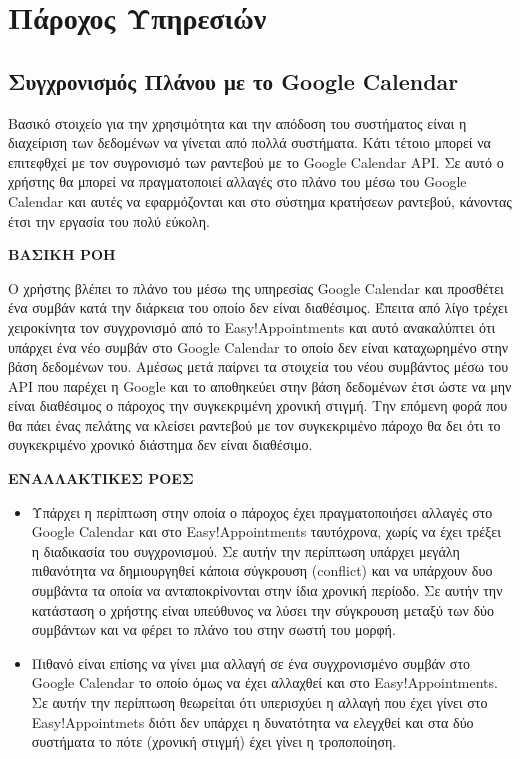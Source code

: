 \section {Πάροχος Υπηρεσιών}
\subsection {Συγχρονισμός Πλάνου με το Google Calendar}
Βασικό στοιχείο για την χρησιμότητα και την απόδοση του συστήματος είναι η διαχείριση των δεδομένων να γίνεται από πολλά συστήματα. Κάτι τέτοιο μπορεί να επιτεφθχεί με τον συγρονισμό των ραντεβού με το Google Calendar API. Σε αυτό ο χρήστης θα μπορεί να πραγματοποιεί αλλαγές στο πλάνο του μέσω του Google Calendar και αυτές να εφαρμόζονται και στο σύστημα κρατήσεων ραντεβού, κάνοντας έτσι την εργασία του πολύ εύκολη.

\textbf{ΒΑΣΙΚΗ ΡΟΗ}

Ο χρήστης βλέπει το πλάνο του μέσω της υπηρεσίας Google Calendar και προσθέτει ένα συμβάν κατά την διάρκεια του οποίο δεν είναι διαθέσιμος. Έπειτα από λίγο τρέχει χειροκίνητα τον συγχρονισμό από το Easy!Appointments και αυτό ανακαλύπτει ότι υπάρχει ένα νέο συμβάν στο Google Calendar το οποίο δεν είναι καταχωρημένο στην βάση δεδομένων του. Αμέσως μετά παίρνει τα στοιχεία του νέου συμβάντος μέσω του API που παρέχει η Google και το αποθηκεύει στην βάση δεδομένων έτσι ώστε να μην είναι διαθέσιμος ο πάροχος την συγκεκριμένη χρονική στιγμή. Την επόμενη φορά που θα πάει ένας πελάτης να κλείσει ραντεβού με τον συγκεκριμένο πάροχο θα δει ότι το συγκεκριμένο χρονικό διάστημα δεν είναι διαθέσιμο.

\textbf{ΕΝΑΛΛΑΚΤΙΚΕΣ ΡΟΕΣ}

\begin{itemize}
\item Υπάρχει η περίπτωση στην οποία ο πάροχος έχει πραγματοποιήσει αλλαγές στο Google Calendar και στο Easy!Appointments ταυτόχρονα, χωρίς να έχει τρέξει η διαδικασία του συγχρονισμού. Σε αυτήν την περίπτωση υπάρχει μεγάλη πιθανότητα να δημιουργηθεί κάποια σύγκρουση (conflict) και να υπάρχουν δυο συμβάντα τα οποία να ανταποκρίνονται στην ίδια χρονική περίοδο. Σε αυτήν την κατάσταση ο χρήστης είναι υπεύθυνος να λύσει την σύγκρουση μεταξύ των δύο συμβάντων και να φέρει το πλάνο του στην σωστή του μορφή.
\item Πιθανό είναι επίσης να γίνει μια αλλαγή σε ένα συγχρονισμένο συμβάν στο Google Calendar το οποίο όμως να έχει αλλαχθεί και στο Easy!Appointments. Σε αυτήν την περίπτωση θεωρείται ότι υπερισχύει η αλλαγή που έχει γίνει στο Easy!Appointmets διότι δεν υπάρχει η δυνατότητα να ελεγχθεί και στα δύο συστήματα το πότε (χρονική στιγμή) έχει γίνει η τροποποίηση.
\end{itemize}

